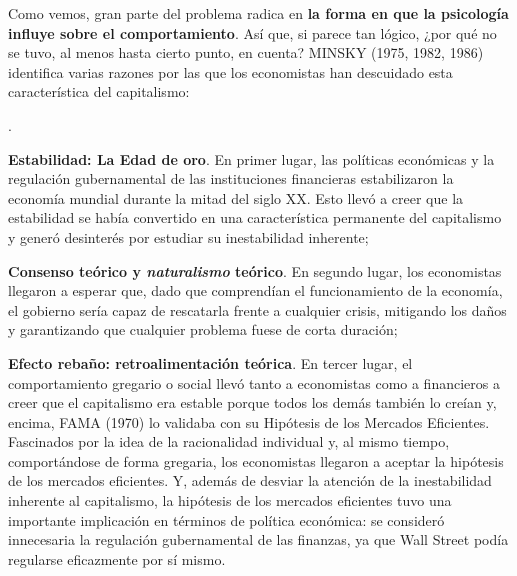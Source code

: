 \documentclass[10pt,a4paper]{article}
\newcounter{numitem}
\newenvironment{lnum}
      {\begin{list}{\arabic{numitem}.}{%
          \usecounter{numitem}%
          \setlength{\leftmargin}{1cm}%
          \setlength{\parskip}{3pt}%
          \setlength{\itemsep}{0pt}%
          \setlength{\parsep}{0pt}%
      }}
      {\end{list}}
\begin{document}
Como vemos, gran parte del problema radica en \textbf{la forma en que la psicología influye sobre el comportamiento}. Así que, si parece tan lógico, ¿por qué no se tuvo, al menos hasta cierto punto, en cuenta? MINSKY (1975, 1982, 1986) identifica varias razones por las que los economistas han descuidado esta característica del capitalismo:
\begin{lnum}
    \item \textbf{Estabilidad: La Edad de oro}. En primer lugar, las políticas económicas y la regulación gubernamental de las instituciones financieras estabilizaron la economía mundial durante la mitad del siglo XX. Esto llevó a creer que la estabilidad se había convertido en una característica permanente del capitalismo y generó desinterés por estudiar su inestabilidad inherente;
    \item \textbf{Consenso teórico y \textit{naturalismo} teórico}. En segundo lugar, los economistas llegaron a esperar que, dado que comprendían el funcionamiento de la economía, el gobierno sería capaz de rescatarla frente a cualquier crisis, mitigando los daños y garantizando que cualquier problema fuese de corta duración;
    \item \textbf{Efecto rebaño: retroalimentación teórica}. En tercer lugar, el comportamiento gregario o social llevó tanto a economistas como a financieros a creer que el capitalismo era estable porque todos los demás también lo creían y, encima, FAMA (1970) lo validaba con su Hipótesis de los Mercados Eficientes. Fascinados por la idea de la racionalidad individual y, al mismo tiempo, comportándose de forma gregaria, los economistas llegaron a aceptar la hipótesis de los mercados eficientes. Y, además de desviar la atención de la inestabilidad inherente al capitalismo, la hipótesis de los mercados eficientes tuvo una importante implicación en términos de política económica: se consideró innecesaria la regulación gubernamental de las finanzas, ya que Wall Street podía regularse eficazmente por sí mismo.
\end{lnum}
\end{document}
